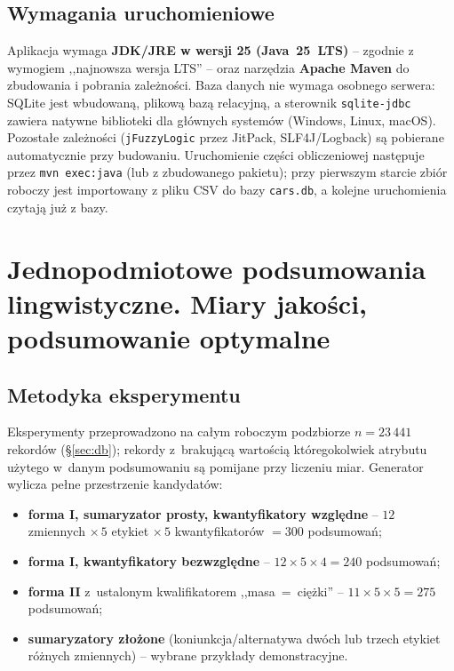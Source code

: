 \documentclass{article}
\begin{document}
\subsection{Wymagania uruchomieniowe}
Aplikacja wymaga \textbf{JDK/JRE w wersji 25 (Java~25~LTS)} -- zgodnie
z wymogiem ,,najnowsza wersja LTS'' -- oraz narzędzia \textbf{Apache Maven}
do zbudowania i pobrania zależności. Baza danych nie wymaga osobnego serwera:
SQLite jest wbudowaną, plikową bazą relacyjną, a sterownik \texttt{sqlite-jdbc}
zawiera natywne biblioteki dla głównych systemów (Windows, Linux, macOS).
Pozostałe zależności (\texttt{jFuzzyLogic} przez JitPack, SLF4J/Logback) są
pobierane automatycznie przy budowaniu. Uruchomienie części obliczeniowej
następuje przez \texttt{mvn exec:java} (lub z zbudowanego pakietu); przy
pierwszym starcie zbiór roboczy jest importowany z pliku CSV do bazy
\texttt{cars.db}, a kolejne uruchomienia czytają już z bazy.

\section{Jednopodmiotowe podsumowania lingwistyczne. Miary jakości, podsumowanie optymalne}
\label{sec:single}

\subsection{Metodyka eksperymentu}
\label{sec:single-method}

Eksperymenty przeprowadzono na całym roboczym podzbiorze
$n = 23\,441$ rekordów (\S\ref{sec:db}); rekordy z~brakującą wartością
któregokolwiek atrybutu użytego w~danym podsumowaniu są pomijane przy
liczeniu miar. Generator wylicza pełne przestrzenie kandydatów:
\begin{itemize}
    \item \textbf{forma I, sumaryzator prosty, kwantyfikatory względne} --
    $12$ zmiennych $\times\,5$ etykiet $\times\,5$ kwantyfikatorów
    $= 300$ podsumowań;
    \item \textbf{forma I, kwantyfikatory bezwzględne} --
    $12\times 5\times 4 = 240$ podsumowań;
    \item \textbf{forma II} z~ustalonym kwalifikatorem ,,masa~=~ciężki'' --
    $11\times 5\times 5 = 275$ podsumowań;
    \item \textbf{sumaryzatory złożone} (koniunkcja/alternatywa dwóch lub
    trzech etykiet różnych zmiennych) -- wybrane przykłady demonstracyjne.
\end{itemize}
\end{document}
